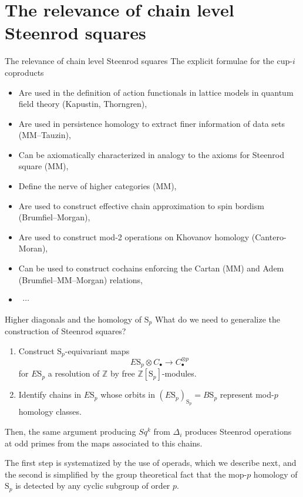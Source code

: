 \documentclass[10pt,t, handout]{beamer} %
\renewcommand{\S}{\mathrm{S}}
\begin{document}
\section{The relevance of chain level Steenrod squares}

\begin{frame}{The relevance of chain level Steenrod squares}
	The explicit formulae for the cup-$i$ coproducts	
	\begin{itemize}
		\item Are used in the definition of action functionals in lattice models in quantum field theory (Kapustin, Thorngren), \pause
		\item Are used in persistence homology to extract finer information of data sets (MM--Tauzin), \pause
		\item Can be axiomatically characterized in analogy to the axioms for Steenrod square (MM), \pause
		\item Define the nerve of higher categories (MM), \pause
		\item Are used to construct effective chain approximation to spin bordism (Brumfiel--Morgan), \pause
		\item Are used to construct mod-2 operations on Khovanov homology (Cantero-Moran), \pause
		\item Can be used to construct cochains enforcing the Cartan (MM) and Adem (Brumfiel--MM--Morgan) relations,
		\item \ $\cdots$
	\end{itemize}
\end{frame}


\begin{frame}{Higher diagonals and the homology of $\S_p$}
	What do we need to generalize the construction of Steenrod squares?
	
	\pause \vspace{10pt}
	
	\begin{enumerate}
		\item Construct $\S_p$-equivariant maps
		\begin{equation*}
		E\S_p \otimes C_\bullet \to C_\bullet^{\otimes p}
		\end{equation*}
		for $E\S_p$ a resolution of $\mathbb Z$ by free $\mathbb Z[\S_p]$-modules.
		\vspace*{10pt} \pause
		\item Identify chains in $E\S_p$ whose orbits in $(E\S_p)_{\S_p} = B\S_p$ represent mod-$p$ homology classes.
	\end{enumerate}
	
	\vspace*{10pt}\pause

	Then, the same argument producing $Sq^k$ from $\Delta_i$ produces Steenrod operations at odd primes from the maps associated to this chains.

	\vspace*{10pt}\pause

	The first step is systematized by the use of operads, which we describe next, and the second is simplified by the group theoretical fact that the mop-$p$ homology of $\S_p$ is detected by any cyclic subgroup of order $p$.
\end{frame}
\end{document}
